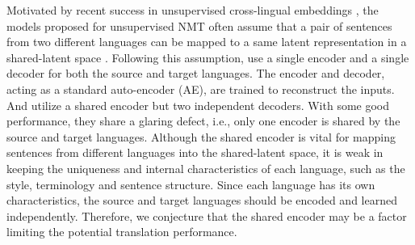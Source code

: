 \documentclass[11pt,a4paper]{article}
\begin{document}
Motivated by recent success in unsupervised cross-lingual embeddings \cite{Artetxe2016Learning,Zhang2017Adversarial,Conneau2017Word}, the models proposed for unsupervised NMT often assume that a pair of sentences from two different languages can be mapped to a same latent representation in a shared-latent space \cite{Lample2017Unsupervised,Artetxe2017Unsupervised}. Following this assumption, \citet{Lample2017Unsupervised} use a single encoder and a single decoder for both the source and target languages. The encoder and decoder, acting as a standard auto-encoder (AE), are trained to reconstruct the inputs. And \citet{Artetxe2017Unsupervised} utilize a shared encoder but two independent decoders. With some good performance, they share a glaring defect, i.e., only one encoder is shared by the source and target languages. Although the shared encoder is vital for mapping sentences from different languages into the shared-latent space, it is weak in keeping the uniqueness and internal characteristics of each language, such as the style, terminology and sentence structure. Since each language has its own characteristics, the source and target languages should be encoded and learned independently. Therefore, we conjecture that the shared encoder may be a factor limiting the potential translation performance.
\end{document}

